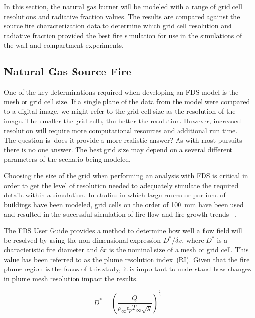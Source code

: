 \documentclass[twoside]{uocthesis}
\begin{document}
{In this section, the natural gas burner will be modeled with a range of grid cell resolutions and radiative fraction values.  The results are compared against the source fire characterization data to determine which grid cell resolution and radiative fraction provided the best fire simulation for use in the simulations of the wall and compartment experiments.      

\subsection{Natural Gas Source Fire}

One of the key determinations required when developing an FDS model is the mesh or grid cell size.  If a single plane of the data from the model were compared to a digital image, we might refer to the grid cell size as the resolution of the image.  The smaller the grid cells, the better the resolution. However, increased resolution will require more computational resources and additional run time. The question is, does it provide a more realistic answer?  As with most pursuits there is no one answer.  The best grid size may depend on a several different parameters of the scenario being modeled. 

Choosing the size of the grid when performing an analysis with FDS is critical in order to get the level of resolution needed to adequately simulate the required details within a simulation. In studies in which large rooms or portions of buildings have been modeled, grid cells on the order of 100~mm have been used and resulted in the successful simulation of fire flow and fire growth trends ~\cite{Grosshandler:Station,Madrzykowski:2004,Vettori:2000, Barowy:2012,Overholt:San_Francisco,Weinschenk:Chicago}.

 The FDS User Guide provides a method to determine how well a flow field will be resolved by using the non-dimensional expression ${D^*}/{\delta x}$, where $D^*$ is a characteristic fire diameter and $\delta x$ is the nominal size of a mesh or grid cell. This value has been referred to as the plume resolution index~(RI). Given that the fire plume region is the focus of this study, it is important to understand how changes in plume mesh resolution impact the results.    

\begin{equation}
 D^* = \left(
     \frac{\dot Q}{\rho_\infty  c_p  T_\infty  \sqrt{g} }
     \right)^\frac{2}{5} 
 \end{equation}

}
\end{document}

